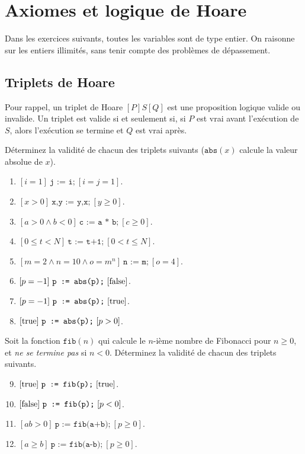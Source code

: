 \section{Axiomes et logique de Hoare}
Dans les exercices suivants, toutes les variables sont de type entier.
On raisonne sur les entiers illimités,
sans tenir compte des problèmes de dépassement.
\subsection{Triplets de Hoare}
Pour rappel, un triplet de Hoare $[P]S[Q]$
est une proposition logique valide ou invalide.
Un triplet est valide si et seulement si,
si $P$ est vrai avant l'exécution de $S$,
alors l'exécution se termine et $Q$ est vrai après.

Déterminez la validité de chacun des triplets suivants
($\texttt{abs}(x)$ calcule la valeur absolue de $x$).
\begin{multicols}{2}
\begin{enumerate}[label={\textbf{\alph*.}}]
	\item $[i = 1]\ \texttt{j := i;}\ [i = j = 1]$.
	\item $[x > 0]\ \texttt{x,y := y,x;}\ [y \ge 0]$.
	\item $[a > 0 \land b < 0]\ \texttt{c := a * b;}\ [c \ge 0]$.
	\item $[0 \le t < N]\ \texttt{t := t+1;}\ [0 < t \le N]$.
	\item $[m = 2 \land n = 10 \land o = m^n]\ \texttt{n := m;}\ [o = 4]$.
	\item $[p = -1]\ \texttt{p := abs(p);}\ [\false]$.
	\item $[p = -1]\ \texttt{p := abs(p);}\ [\true]$.
	\item $[\textnormal{true}]\ \texttt{p := abs(p);}\ [p > 0]$.
\end{enumerate}
\end{multicols}

Soit la fonction $\texttt{fib}(n)$ qui calcule le $n$-ième nombre de Fibonacci
pour $n \ge 0$, et \emph{ne se termine pas} si $n < 0$.
Déterminez la validité de chacun des triplets suivants.

\begin{multicols}{2}
\begin{enumerate}[label={\textbf{\alph*.}}]
	\setcounter{enumi}{8}
	\item $[\true]\ \texttt{p := fib(p);}\ [\true]$.
	\item $[\textnormal{false}]\ \texttt{p := fib(p);}\ [p < 0]$.
	\item $[ab > 0]\ \texttt{p := fib(a+b);}\ [p \ge 0]$.
	\item $[a \ge b]\ \texttt{p := fib(a-b);}\ [p \ge 0]$.
\end{enumerate}
\end{multicols}

